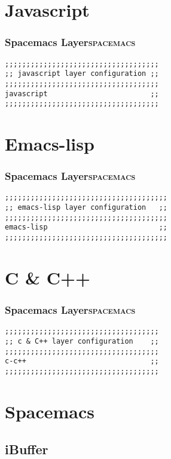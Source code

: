 \documentclass[11pt]{article}
\begin{document}
\section{Javascript}
\label{sec:org8b3a9f5}
\subsubsection{Spacemacs Layer\hfill{}\textsc{spacemacs}}
\label{sec:org527b2df}
\begin{verbatim}
;;;;;;;;;;;;;;;;;;;;;;;;;;;;;;;;;;;;
;; javascript layer configuration ;;
;;;;;;;;;;;;;;;;;;;;;;;;;;;;;;;;;;;;
javascript                        ;;
;;;;;;;;;;;;;;;;;;;;;;;;;;;;;;;;;;;;
\end{verbatim}

\section{Emacs-lisp}
\label{sec:orgeda6ac4}
\subsubsection{Spacemacs Layer\hfill{}\textsc{spacemacs}}
\label{sec:orgf0bfc3e}
\begin{verbatim}
;;;;;;;;;;;;;;;;;;;;;;;;;;;;;;;;;;;;;;
;; emacs-lisp layer configuration   ;;
;;;;;;;;;;;;;;;;;;;;;;;;;;;;;;;;;;;;;;
emacs-lisp                          ;;
;;;;;;;;;;;;;;;;;;;;;;;;;;;;;;;;;;;;;;
\end{verbatim}

\section{C \& C++}
\label{sec:org4122860}
\subsubsection{Spacemacs Layer\hfill{}\textsc{spacemacs}}
\label{sec:org14945f7}
\begin{verbatim}
;;;;;;;;;;;;;;;;;;;;;;;;;;;;;;;;;;;;
;; c & C++ layer configuration    ;;
;;;;;;;;;;;;;;;;;;;;;;;;;;;;;;;;;;;;
c-c++                             ;;
;;;;;;;;;;;;;;;;;;;;;;;;;;;;;;;;;;;;
\end{verbatim}

\section{Spacemacs}
\label{sec:org04f18d0}
\subsection{iBuffer}
\label{sec:orgb67bd46}
\end{document}
